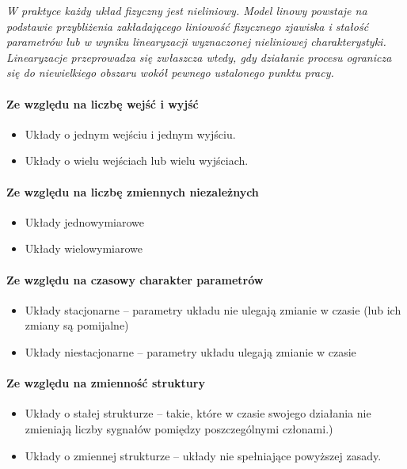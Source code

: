\documentclass[a4paper,twoside]{report}
\begin{document}
\textit{W praktyce każdy układ fizyczny jest nieliniowy. Model linowy powstaje
na podstawie przybliżenia zakładającego liniowość fizycznego
zjawiska i stałość parametrów lub w wyniku linearyzacji wyznaczonej
nieliniowej charakterystyki. Linearyzacje przeprowadza się zwłaszcza
wtedy, gdy działanie procesu ogranicza się do niewielkiego obszaru
wokół pewnego ustalonego punktu pracy.}
\paragraph{Ze względu na liczbę wejść i wyjść}
\begin{itemize}
\item Układy o jednym wejściu i jednym wyjściu.
 \item  Układy o wielu wejściach lub wielu wyjściach.
\end{itemize}
\paragraph{Ze względu na  liczbę zmiennych niezależnych}
\begin{itemize}
\item Układy jednowymiarowe
 \item Układy wielowymiarowe
\end{itemize}

\paragraph{Ze względu na czasowy charakter parametrów}
\begin{itemize}
\item Układy stacjonarne – parametry układu nie ulegają zmianie w czasie (lub ich zmiany są pomijalne)
 \item Układy niestacjonarne – parametry układu ulegają zmianie w czasie
\end{itemize}

\paragraph{Ze względu  na zmienność struktury }
\begin{itemize}
\item Układy o stałej strukturze – takie, które w czasie swojego działania nie zmieniają liczby sygnałów pomiędzy poszczególnymi członami.)
 \item Układy o zmiennej strukturze – układy nie spełniające powyższej zasady.
\end{itemize}
\end{document}
